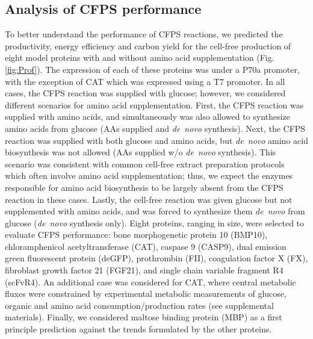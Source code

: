 \documentclass[journal=asbcd6,manuscript=article]{achemso}
\begin{document}
\subsection{Analysis of CFPS performance}
To better understand the performance of CFPS reactions, we predicted the productivity, energy efficiency and carbon yield for the cell-free production of eight model proteins with and without amino acid supplementation (Fig. \ref{fig:Prof}).
The expression of each of these proteins was under a P70a promoter, with the exception of CAT which was expressed using a T7 promoter.
In all cases, the CFPS reaction was supplied with glucose; however, we considered different scenarios for amino acid supplementation.
First, the CFPS reaction was supplied with amino acids, and simultaneously was also allowed to synthesize amino acids from glucose (AAs supplied and \textit{de~novo} synthesis).
Next, the CFPS reaction was supplied with both glucose and amino acids, but \textit{de~novo} amino acid biosynthesis was not allowed (AAs supplied w/o \textit{de~novo} synthesis).
This scenario was consistent with common cell-free extract preparation protocols which often involve amino acid supplementation;
thus, we expect the enzymes responsible for amino acid biosynthesis to be largely absent from the CFPS reaction in these cases.
Lastly, the cell-free reaction was given glucose but not supplemented with amino acids, and was forced to synthesize them \textit{de~novo} from glucose (\textit{de~novo} synthesis only).
Eight proteins, ranging in size, were selected to evaluate CFPS performance: bone morphogenetic protein 10 (BMP10),
chloramphenicol acetyltransferase (CAT), caspase 9 (CASP9), dual emission green fluorescent protein (deGFP),
prothrombin (FII), coagulation factor X (FX), fibroblast growth factor 21 (FGF21), and single chain variable fragment R4 (scFvR4).
An additional case was considered for CAT, where central metabolic fluxes were constrained by experimental metabolic measurements of glucose, organic and amino acid consumption/production rates (see supplemental materials).
Finally, we considered maltose binding protein (MBP) as a first principle prediction against the trends formulated by the other proteins.
\end{document}
